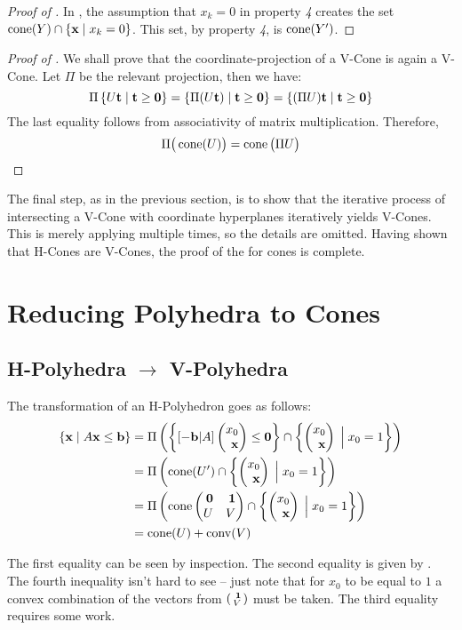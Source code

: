 \begin{proof}[Proof of ]
	In , the assumption that $x_k = 0$ in property \textit{4} creates the set $\operatorname{cone}(Y) \cap \left\{\mathbf{x} \;|\; x_k = 0\right\}$.  This set, by property \textit{4}, is $\operatorname{cone}(Y')$.
\end{proof}

\begin{proof}[Proof of ]
	We shall prove that the coordinate-projection of a V-Cone is again a V-Cone.  Let $\Pi$ be the relevant projection, then we have:
	\[ \Pi\left\{U\mathbf{t} \;|\; \mathbf{t} \geq \mathbf{0}\right\} = \left\{\Pi(U\mathbf{t}) \;|\; \mathbf{t} \geq \mathbf{0}\right\} =
		\left\{(\Pi U)\mathbf{t} \;|\; \mathbf{t} \geq \mathbf{0}\right\} \]
	The last equality follows from associativity of matrix multiplication.  Therefore,
	\[ \Pi\big(\operatorname{cone}(U)\big) = \operatorname{cone}\big(\Pi U\big) \]
\end{proof}

The final step, as in the previous section, is to show that the iterative process of intersecting a V-Cone with coordinate hyperplanes iteratively yields V-Cones.  This is merely applying  multiple times, so the details are omitted.  Having shown that H-Cones are V-Cones, the proof of the {\MWT} for cones is complete.

\section{Reducing Polyhedra to Cones}

\subsection{H-Polyhedra $\to$ V-Polyhedra}

The transformation of an H-Polyhedron goes as follows:
\begin{align*} 
\{\x\st A\x\leq\b\}
    &= \Pi\left(\left\{
      [-\b|A]\xx\leq\0\right
      \}\cap\hpxz\right) \\
    &= \Pi\left(\cone(U')\cap\hpxz\right)\\ 
    &= \Pi\left(\cone\pmb \0 & \1 \\ U & V\pme \cap\hpxz\right)\\
    &= \cone(U) + \conv(V)
\end{align*}

The first equality can be seen by inspection.  The second equality is given by .  The fourth inequality isn't hard to see -- just note that for $x_0$ to be equal to $1$ a convex combination of the vectors from $\psmb\1\\ V\psme$ must be taken.  The third equality requires some work.

